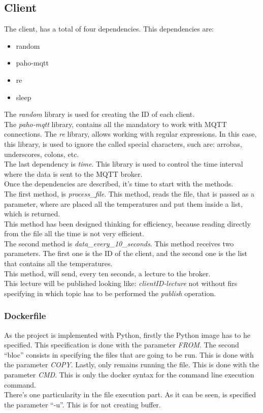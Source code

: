 \documentclass[a4paper,12pt]{article}
\begin{document}
\subsection*{Client}
The client, has a total of four dependencies. This dependencies are:
\begin{itemize}
    \item random
    \item paho-mqtt
    \item re
    \item sleep
\end{itemize}
The \textit{random} library is used for creating the ID of each client.\\
The \textit{paho-mqtt} library, contains all the mandatory to work with MQTT connections.
The \textit{re} library, allows working with regular expressions. In this case, this library, is used to ignore the called special characters, such are: arrobas, underscores, colons, etc.\\
The last dependency is \textit{time}. This library is used to control the time interval where the data is sent to the MQTT broker.\\
Once the dependencies are described, it's time to start with the methods.\\
The first method, is \textit{process\_file}. This method, reads the file, that is passed as a parameter, where are placed all the temperatures and put them inside a list, which is returned.\\
This method has been designed thinking for efficiency, because reading directly from the file all the time is not very efficient.\\
The second method is \textit{data\_every\_10\_seconds}. This method receives two parameters. The first one is the ID of the client, and the second one is the list that contains all the temperatures.\\
This method, will send, every ten seconds, a lecture to the broker.\\
This lecture will be published looking like: \textit{clientID-lecture} not without firs specifying in which topic has to be performed the \textit{publish} operation.
\subsubsection*{Dockerfile}
As the project is implemented with Python, firstly the Python image has to he specified. This specification is done with the parameter \textit{FROM}. The second “bloc” consists in specifying the files that are going to be run. This is done with the parameter \textit{COPY}. Lastly, only remains running the file. This is done with the parameter \textit{CMD}. This is only the docker syntax for the command line execution command.\\
There's one particularity in the file execution part. As it can be seen, is specified the parameter “-u”. This is for not creating buffer.
\end{document}
